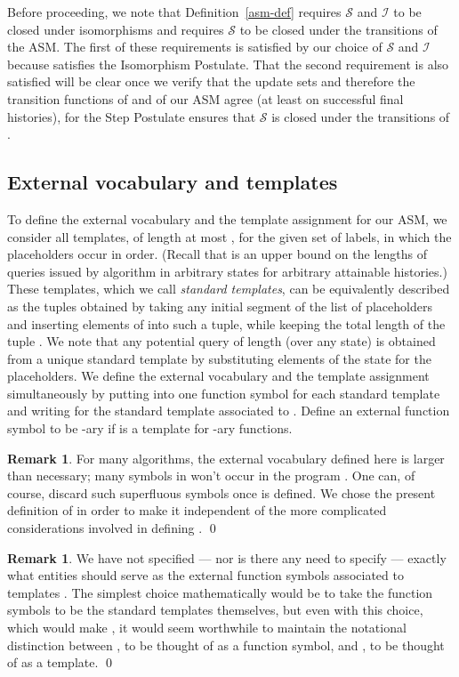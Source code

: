 \documentclass{LMCS}
\theoremstyle{definition}
\newtheorem{rmk}[thm]{Remark}
\newcommand{\scr}[1]{\ensuremath{\mathcal {#1}}}
\begin{document}
Before proceeding, we note that Definition~\ref{asm-def} requires \scr
S and \scr I to be closed under isomorphisms and requires \scr S to be
closed under the transitions of the ASM.  The first of these
requirements is satisfied by our choice of \scr S and \scr I because
 satisfies the Isomorphism Postulate.  That the second requirement
is also satisfied will be clear once we verify that the update sets
and therefore the transition functions of  and of our ASM agree (at
least on successful final histories), for the Step Postulate ensures
that \scr S is closed under the transitions of .

\subsection{External vocabulary and templates}
\label{sub:extvoc}

To define the external vocabulary  and the template assignment for
our ASM, we consider all templates, of length at most , for the
given set  of labels, in which the placeholders  occur
in order.  (Recall that  is an upper bound on the lengths of
queries issued by algorithm  in arbitrary states for arbitrary
attainable histories.)  These templates, which we call \emph{standard
templates}, can be equivalently described as the tuples obtained by
taking any initial segment of the list  of placeholders
and inserting elements of  into such a tuple, while keeping
the total length of the tuple .  We note that any potential
query of length  (over any state) is obtained from a unique
standard template by substituting elements of the state for the
placeholders.  We define the external vocabulary  and the template
assignment simultaneously by putting into  one function symbol 
for each standard template and writing  for the standard
template associated to .  Define an external function symbol  to
be -ary if  is a template for -ary functions.

\begin{rmk}
For many algorithms, the external vocabulary defined here is larger
than necessary; many symbols in  won't occur in the program .
One can, of course, discard such superfluous symbols once  is
defined.  We chose the present definition of  in order to make it
independent of the more complicated considerations involved in
defining .  
\qed\end{rmk}

\begin{rmk}
We have not specified --- nor is there any need to specify --- exactly
what entities should serve as the external function symbols 
associated to templates .  The simplest choice mathematically
would be to take the function symbols to be the standard templates
themselves, but even with this choice, which would make , it
would seem worthwhile to maintain the notational distinction between
, to be thought of as a function symbol, and , to be
thought of as a template.
\qed\end{rmk}
\end{document}
